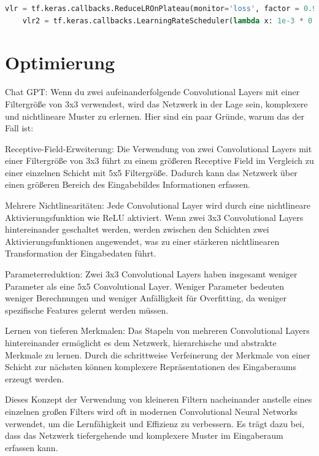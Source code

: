 \documentclass[
fontsize=12pt,					%
paper=a4,						%
twoside=true, 					%
listof=totoc, 					%
bibliography=totoc,				%
titlepage, 						%
headsepline, 					%
DIV=12,							%
BCOR=6mm,						%
cleardoublepage=empty,			%
parskip,							%
ngerman
]{scrartcl}
\begin{document}
\begin{lstlisting}[language=Python, caption=Variable Learning-Rate, label=vlr]
	vlr = tf.keras.callbacks.ReduceLROnPlateau(monitor='loss', factor = 0.95, patience=10, min_lr=0.0001)		
	vlr2 = tf.keras.callbacks.LearningRateScheduler(lambda x: 1e-3 * 0.995 ** x)
\end{lstlisting}

\section{Optimierung}

Chat GPT:
Wenn du zwei aufeinanderfolgende Convolutional Layers mit einer Filtergröße von 3x3 verwendest, wird das Netzwerk in der Lage sein, komplexere und nichtlineare Muster zu erlernen. Hier sind ein paar Gründe, warum das der Fall ist:

Receptive-Field-Erweiterung: Die Verwendung von zwei Convolutional Layers mit einer Filtergröße von 3x3 führt zu einem größeren Receptive Field im Vergleich zu einer einzelnen Schicht mit 5x5 Filtergröße. Dadurch kann das Netzwerk über einen größeren Bereich des Eingabebildes Informationen erfassen.

Mehrere Nichtlinearitäten: Jede Convolutional Layer wird durch eine nichtlineare Aktivierungsfunktion wie ReLU aktiviert. Wenn zwei 3x3 Convolutional Layers hintereinander geschaltet werden, werden zwischen den Schichten zwei Aktivierungsfunktionen angewendet, was zu einer stärkeren nichtlinearen Transformation der Eingabedaten führt.

Parameterreduktion: Zwei 3x3 Convolutional Layers haben insgesamt weniger Parameter als eine 5x5 Convolutional Layer. Weniger Parameter bedeuten weniger Berechnungen und weniger Anfälligkeit für Overfitting, da weniger spezifische Features gelernt werden müssen.

Lernen von tieferen Merkmalen: Das Stapeln von mehreren Convolutional Layers hintereinander ermöglicht es dem Netzwerk, hierarchische und abstrakte Merkmale zu lernen. Durch die schrittweise Verfeinerung der Merkmale von einer Schicht zur nächsten können komplexere Repräsentationen des Eingaberaums erzeugt werden.

Dieses Konzept der Verwendung von kleineren Filtern nacheinander anstelle eines einzelnen großen Filters wird oft in modernen Convolutional Neural Networks verwendet, um die Lernfähigkeit und Effizienz zu verbessern. Es trägt dazu bei, dass das Netzwerk tiefergehende und komplexere Muster im Eingaberaum erfassen kann.
\end{document}
